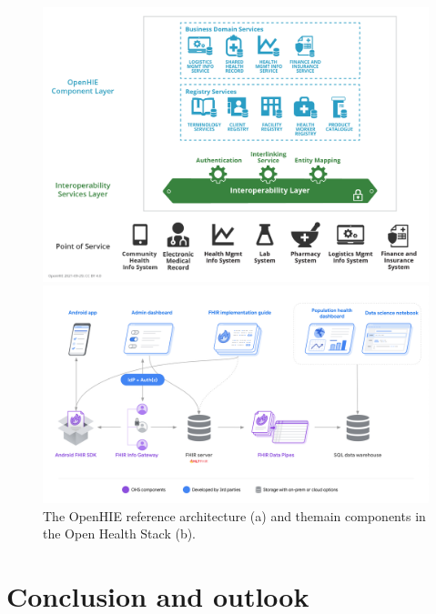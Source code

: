 \documentclass[
  authoryear]{elsarticle}
\begin{document}
\begin{figure}

\begin{minipage}{\linewidth}

\includegraphics{openhie.png}

\end{minipage}%
\newline
\begin{minipage}{\linewidth}

\includegraphics{ohs-endtoend.png}

\end{minipage}%

\caption{\label{fig-openhie}The OpenHIE reference architecture (a) and
themain components in the Open Health Stack (b).}

\end{figure}%

\section{Conclusion and outlook}\label{conclusion-and-outlook}
\end{document}
